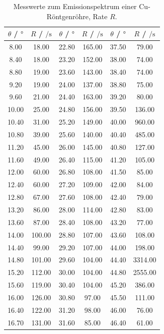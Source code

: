 \begin{table}
  \centering
  \caption{Messwerte zum Emissionspektrum einer Cu-Röntgenröhre, Rate $R$.}
  \label{tab:1}
  \begin{tabular}{c c | c c | c c}
    \toprule
    $\theta$ / $\si{\degree}$ & $R$ / $\si{\per\second}$ & $\theta$ / $\si{\degree}$ & $R$ / $\si{\per\second}$ & $\theta$ / $\si{\degree}$ & $R$ / $\si{\per\second}$ \\
    \midrule
    8.00 & 18.00 & 22.80 & 165.00 & 37.50 & 79.00 \\
    8.40 & 18.00 & 23.20 & 152.00 & 38.00 & 74.00 \\
    8.80 & 19.00 & 23.60 & 143.00 & 38.40 & 74.00 \\
    9.20 & 19.00 & 24.00 & 137.00 & 38.80 & 75.00 \\
    9.60 & 21.00 & 24.40 & 163.00 & 39.20 & 80.00 \\
    10.00 & 25.00 & 24.80 & 156.00 & 39.50 & 136.00 \\
    10.40 & 31.00 & 25.20 & 149.00 & 40.00 & 960.00 \\
    10.80 & 39.00 & 25.60 & 140.00 & 40.40 & 485.00 \\
    11.20 & 45.00 & 26.00 & 145.00 & 40.80 & 127.00 \\
    11.60 & 49.00 & 26.40 & 115.00 & 41.20 & 105.00 \\
    12.00 & 60.00 & 26.80 & 108.00 & 41.50 & 85.00 \\
    12.40 & 60.00 & 27.20 & 109.00 & 42.00 & 84.00 \\
    12.80 & 67.00 & 27.60 & 108.00 & 42.40 & 79.00 \\
    13.20 & 86.00 & 28.00 & 114.00 & 42.80 & 83.00 \\
    13.60 & 87.00 & 28.40 & 108.00 & 43.20 & 77.00 \\
    14.00 & 100.00 & 28.80 & 107.00 & 43.60 & 108.00 \\
    14.40 & 99.00 & 29.20 & 107.00 & 44.00 & 198.00 \\
    14.80 & 101.00 & 29.60 & 104.00 & 44.40 & 3314.00 \\
    15.20 & 112.00 & 30.00 & 104.00 & 44.80 & 2555.00 \\
    15.60 & 119.00 & 30.40 & 104.00 & 45.20 & 386.00 \\
    16.00 & 126.00 & 30.80 & 97.00 & 45.50 & 111.00 \\
    16.40 & 122.00 & 31.20 & 98.00 & 46.00 & 76.00 \\
    16.70 & 131.00 & 31.60 & 85.00 & 46.40 & 61.00 \\

\end{tabular}
\end{table}
